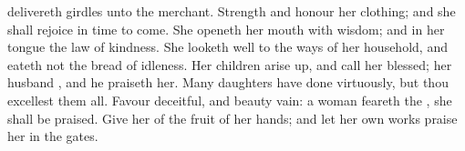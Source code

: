 {delivereth
girdles unto the
merchant.
Strength and
honour
{} her
clothing; and she shall
rejoice in
time to
come.
She
openeth her
mouth with
wisdom; and in her
tongue
{} the
law of
kindness.
She looketh
well to the
ways of her
household, and
eateth not the
bread of
idleness.
Her
children arise
up, and call her
blessed; her
husband
{}, and he
praiseth her.
Many
daughters have
done
virtuously, but thou
excellest them all.
Favour
{}
deceitful, and
beauty
{}
vain:
{} a
woman
{}
feareth the
{}, she shall be
praised.
Give her of the
fruit of her
hands; and let her own
works
praise her in the
gates.
\par }